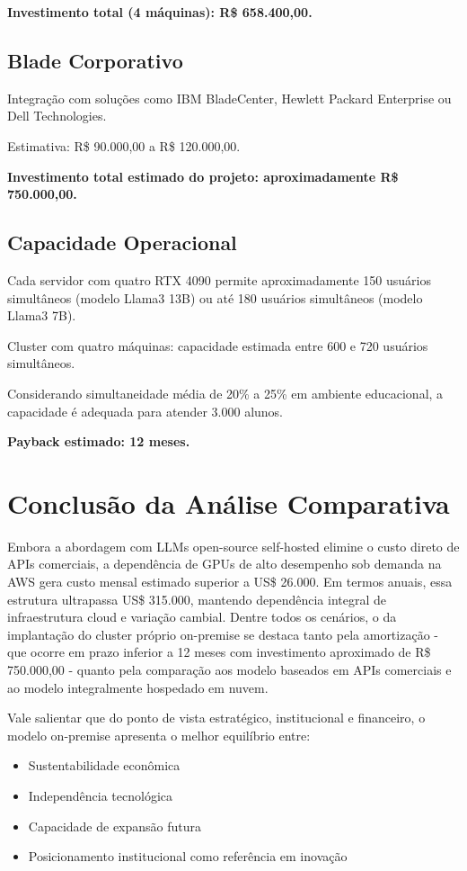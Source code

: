 \documentclass[12pt,a4paper,]{abntex2}
\begin{document}
\textbf{Investimento total (4 máquinas): R\$ 658.400,00.}

\subsection{Blade Corporativo}

Integração com soluções como IBM BladeCenter, Hewlett Packard Enterprise ou Dell Technologies.

Estimativa: R\$ 90.000,00 a R\$ 120.000,00.

\textbf{Investimento total estimado do projeto: aproximadamente R\$ 750.000,00.}

\subsection{Capacidade Operacional}

Cada servidor com quatro RTX 4090 permite aproximadamente 150 usuários simultâneos (modelo Llama3 13B) ou até 180 usuários simultâneos (modelo Llama3 7B).

Cluster com quatro máquinas: capacidade estimada entre 600 e 720 usuários simultâneos.

Considerando simultaneidade média de 20\% a 25\% em ambiente educacional, a capacidade é adequada para atender 3.000 alunos.

\textbf{Payback estimado: 12 meses.}


\section{Conclusão da Análise Comparativa}

Embora a abordagem com LLMs open-source self-hosted elimine o custo direto de APIs comerciais, a dependência de GPUs de alto desempenho sob demanda na AWS gera custo mensal estimado superior a US\$ 26.000.
Em termos anuais, essa estrutura ultrapassa US\$ 315.000, mantendo dependência integral de infraestrutura cloud e variação cambial.
Dentre todos os cenários, o da implantação do cluster próprio on-premise se destaca tanto pela amortização - que ocorre em prazo inferior a 12 meses com investimento aproximado de R\$ 750.000,00 - quanto pela comparação aos modelo baseados em APIs comerciais e ao modelo integralmente hospedado em nuvem.

Vale salientar que do ponto de vista estratégico, institucional e financeiro, o modelo on-premise apresenta o melhor equilíbrio entre:

\begin{itemize}
\item Sustentabilidade econômica
\item Independência tecnológica
\item Capacidade de expansão futura
\item Posicionamento institucional como referência em inovação
\end{itemize}
\end{document}
